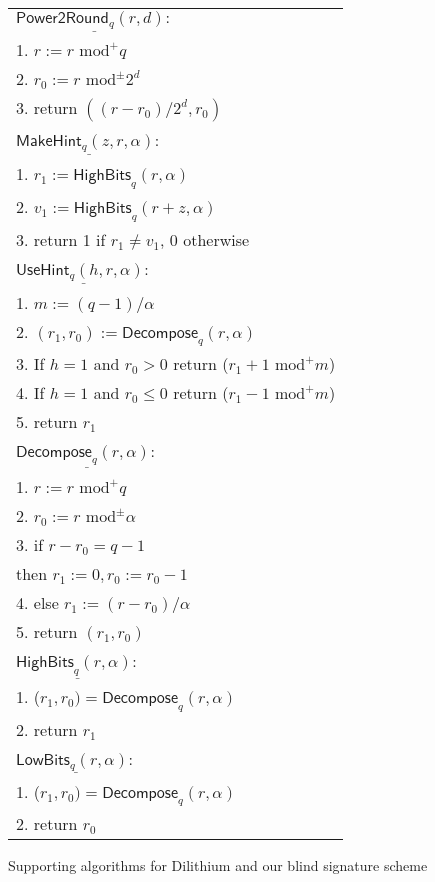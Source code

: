 \documentclass[conference]{IEEEtran}
\begin{document}
		\begin{figure}[h]
			\centering
			\medskip
			\smallskip
			\small\addtolength{\tabcolsep}{8pt}
			\begin{tabular}{ |l |}
				\hline
				$\underline{\textsf{Power2Round}_q(r,d):}$\\
				1. $r:=r \text{ mod}^+ q$\\
				2. $r_0:=r \text{ mod}^{\pm} 2^d$			\\
				3. return $((r-r_0)/2^d,r_0)$\\
				\\
				$\underline{\textsf{MakeHint}_q(z,r,\alpha):}$\\
				1. $r_1:=\textsf{HighBits}_q(r,\alpha)$	\\
				2. $v_1:=\textsf{HighBits}_q(r+z,\alpha)$\\
				3. return 1 if $r_1 \neq v_1$, 0 otherwise\\	
				\\
				
				$\underline{\textsf{UseHint}_q(h,r,\alpha):}$ \\
				1. $m:=(q-1)/\alpha$\\
				2. $(r_1,r_0):=\textsf{Decompose}_q(r,\alpha)$\\
				3. If $h=1$ and $r_0>0$ return ($r_1+1 \text{ mod}^+ m$) \\	
				4. If $h=1$ and $r_0\leq 0$ return ($r_1-1 \text{ mod}^+ m$) \\
				5. return $r_1$ \\
				\\
				
				$\underline{\textsf{Decompose}_q(r,\alpha):}$\\
				1. $r:=r \text{ mod}^+ q$\\
				2. $r_0:=r \text{ mod}^{\pm} \alpha$
				\\
				
				3. if $r-r_0=q-1$\\
				\hspace{0.5cm} then $r_1:=0, r_0:=r_0-1$\\
				4. else $r_1:=(r-r_0)/\alpha$\\
				5. return $(r_1,r_0)$\\
				\\
				$\underline{\textsf{HighBits}_q(r,\alpha):}$\\
				
				1. ($r_1, r_0)=\textsf{Decompose}_q(r,\alpha)$ \\
				2. return $r_1$ \\
				\\
				$\underline{\textsf{LowBits}_q(r,\alpha):}$\\	
				1. ($r_1, r_0)=\textsf{Decompose}_q(r,\alpha)$   \\
				2. return $r_0$\\
				\hline 
			\end{tabular} 
			
			\caption{Supporting algorithms for \textsf{Dilithium} and our blind signature scheme}
			\label{tab4}
		\end{figure}
		
\end{document}

